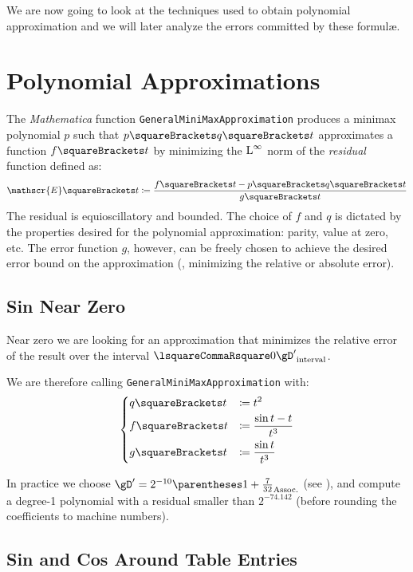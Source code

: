 \documentclass[10pt, a4paper, twoside]{basestyle}
\begin{document}
We are now going to look at the techniques used to obtain polynomial approximation and we will later analyze the errors committed by these formulæ.

\section*{Polynomial Approximations}

The \textit{Mathematica} function \texttt{GeneralMiniMaxApproximation} produces a minimax polynomial $p$ such that $p\of{q\of{t}}$ approximates a function $f\of{t}$ by minimizing the $\operatorname{L}^{\infty}$ norm of the \emph{residual} function defined as:
\[
\mathscr{E}\of{t} \DefineAs \frac{f\of{t} - p\of{q\of{t}}}{g\of{t}}
\]
The residual is equioscillatory and bounded.  The choice of $f$ and $q$ is dictated by the properties desired for the polynomial approximation: parity, value at zero, etc.  The error function $g$, however, can be freely chosen to achieve the desired error bound on the approximation (\exempligratia, minimizing the relative or absolute error).

\subsection*{Sin Near Zero}

Near zero we are looking for an approximation that minimizes the relative error of the result over the interval $\intclos{0}{\gD'}$.

We are therefore calling \texttt{GeneralMiniMaxApproximation} with:
\[
\begin{dcases}
q\of{t} &\DefineAs t^2 \\
f\of{t} &\DefineAs \frac{\sin t - t}{t^3} \\
g\of{t} &\DefineAs \frac{\sin t}{t^3}
\end{dcases}
\]

In practice we choose $\gD' = 2^{-10} \pa{1 + \frac{7}{32}}$ (see ), and compute a degree-1 polynomial with a residual smaller than $2^{-74.142}$ (before rounding the coefficients to machine numbers).

\subsection*{Sin and Cos Around Table Entries}
\end{document}
